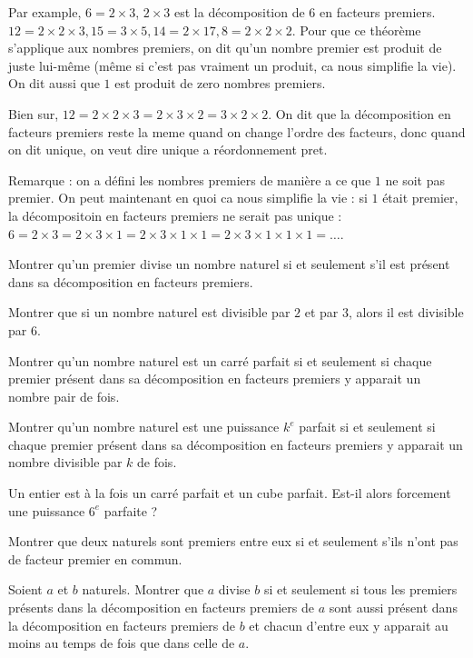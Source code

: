 \endgroup

Par example, \(6 = 2 \times 3\), \(2 \times 3\) est la décomposition de \(6\) en facteurs premiers. \(12 = 2 \times 2 \times 3, 15 = 3 \times 5, 14 = 2 \times 17, 8 = 2 \times 2 \times 2\).
Pour que ce théorème s'applique aux nombres premiers, on dit qu'un nombre premier est produit de juste lui-même (même si c'est pas vraiment un produit, ca nous simplifie la vie). On dit aussi que \(1\) est produit de zero nombres premiers.

Bien sur, \(12 = 2 \times 2 \times 3 = 2 \times 3 \times 2 = 3 \times 2 \times 2\). On dit que la décomposition en facteurs premiers reste la meme quand on change l'ordre des facteurs, donc quand on dit unique, on veut dire unique a réordonnement pret.

Remarque : on a défini les nombres premiers de manière a ce que \(1\) ne soit pas premier. On peut maintenant en quoi ca nous simplifie la vie : si \(1\) était premier, la décompositoin en facteurs premiers ne serait pas unique : \(6 = 2 \times 3 = 2 \times 3 \times 1 = 2 \times 3 \times 1 \times 1 = 2 \times 3 \times 1 \times 1 \times 1 = \ldots\).

\exo
Montrer qu'un premier divise un nombre naturel si et seulement s’il est présent dans sa décomposition en facteurs premiers.

\exo
Montrer que si un nombre naturel est divisible par \(2\) et par \(3\), alors il est divisible par \(6\).

\exo

Montrer qu’un nombre naturel est un carré parfait si et seulement si chaque premier présent dans sa décomposition en facteurs premiers y apparait un nombre pair de fois.

Montrer qu’un nombre naturel est une puissance \(k^{e}\) parfait si et seulement si chaque premier présent dans sa décomposition en facteurs premiers y apparait un nombre divisible par \(k\) de fois.

\exo
Un entier est à la fois un carré parfait et un cube parfait.
Est-il alors forcement une puissance \(6^{e}\) parfaite ?

\exo

Montrer que deux naturels sont premiers entre eux si et seulement s’ils n'ont pas de facteur premier en commun.


\exo
Soient \(a\) et \(b\) naturels.
Montrer que \(a\) divise \(b\) si et seulement si tous les premiers présents dans la décomposition en facteurs premiers de \(a\) sont aussi présent dans la décomposition en facteurs premiers de \(b\) et chacun d'entre eux y apparait au moins au temps de fois que dans celle de \(a\).


